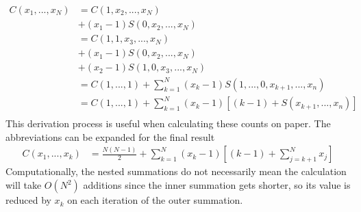 \documentclass[12pt]{article}
\begin{document}
\begin{equation}
\begin{aligned}
    C(x_1,...,x_N) &= C(1,x_2,...,x_N) \\
                   &+ (x_1 - 1) S(0,x_2,...,x_N) \\
                   &= C(1,1,x_3,...,x_N) \\
                   &+ (x_1 - 1) S(0,x_2,...,x_N) \\
                   &+ (x_2 - 1) S(1,0,x_3,...,x_N) \\
                   &= C(1,...,1) + \sum_{k=1}^{N} (x_k - 1) S(1,...,0,x_{k+1},...,x_n) \\
                   &= C(1,...,1) + \sum_{k=1}^{N} (x_k - 1) \left[ (k-1) + S(x_{k+1},...,x_n) \right] \\
\end{aligned}
\end{equation}
This derivation process is useful when calculating these counts on paper.
The abbreviations can be expanded for the final result
\begin{equation}
\begin{aligned}
    C(x_1,...,x_k) &= \frac{N(N-1)}{2} + \sum_{k=1}^{N} (x_k - 1) \left[ (k-1) + \sum_{j=k+1}^{N} x_j \right]
\end{aligned}
\end{equation}
Computationally, the nested summations do not necessarily mean the calculation
will take $O(N^2)$ additions since the inner summation gets shorter, so its value is reduced by $x_k$ on each iteration of the outer summation.
\end{document}
